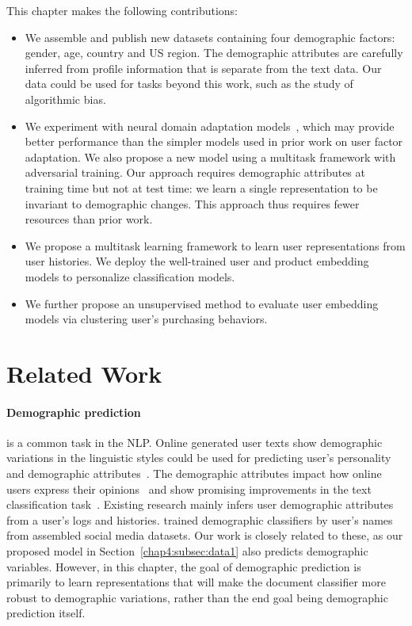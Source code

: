 This chapter makes the following contributions:

\begin{itemize}
    \item We assemble and publish new datasets containing four demographic factors: gender, age, country and US region. The demographic attributes are carefully inferred from profile information that is separate from the text data. Our data could be used for tasks beyond this work, such as the study of algorithmic bias.
    \item We experiment with neural domain adaptation models~\cite{ganin2016domain}, which may provide better performance than the simpler models used in prior work on user factor adaptation. We also propose a new model using a multitask framework with adversarial training. Our approach requires demographic attributes at training time but not at test time: we learn a single representation to be invariant to demographic changes. This approach thus requires fewer resources than prior work.
    \item We propose a multitask learning framework to learn user representations from user histories. We deploy the well-trained user and product embedding models to personalize classification models. 
    \item We further propose an unsupervised method to evaluate user embedding models via clustering user's purchasing behaviors.
\end{itemize}


\section{Related Work}

\paragraph{Demographic prediction}
is a common task in the NLP.
Online generated user texts show demographic variations in the linguistic styles could be used for predicting user's personality and demographic attributes~\cite{rosenthal2011age, zhang2016predicting, hovy2018improving, wood2020using, gjurkovic2020pandora, lynn2020hierarchical}. 
The demographic attributes impact how online users express their opinions~\cite{volkova2013exploring, hovy2015demographic, wood2017does} and show promising improvements in the text classification task~\cite{lynn2017human, lynn2019tweet}.
Existing research mainly infers user demographic attributes from a user's logs and histories.
\cite{wood2020using} trained demographic classifiers by user's names from assembled social media datasets.
Our work is closely related to these, as our proposed model in Section~\ref{chap4:subsec:data1} also predicts demographic variables.
However, in this chapter, the goal of demographic prediction is primarily to learn representations that will make the document classifier more robust to demographic variations, rather than the end goal being demographic prediction itself.

